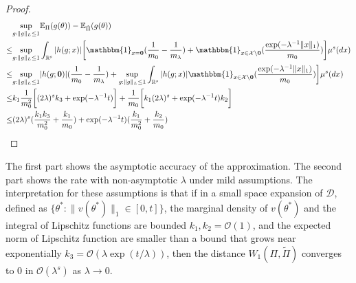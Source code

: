 \documentclass[10pt,fleqn]{article}
\newcommand{\bb}[1]{\mathbb{#1}}
\newcommand{\mc}[1]{\mathcal{#1}}
\DeclareMathOperator{\1}{\mathbbm{1}}
\begin{document}
\begin{proof}[Proof]
\begin{equation}
\begin{aligned}
& \underset{g:\|g\|_L\le 1}\sup \bb E_{\Pi}(g(\theta)) -
\bb E_{\tilde \Pi}(g(\theta)) \\
\le & \underset{g:\|g\|_L\le 1}\sup\int_{\mathbb{R}^{s}}  |h(g; x)| 
 \bigg[ \mathbbm{1}_{x=\bf 0}(\frac{1}{m_0}-\frac{1}{m_\lambda})
 + \mathbbm{1}_{x \in \mc X \setminus\bf 0}(\frac{ \exp(- \lambda^{-1} \|x\|_1) }{m_0})
\bigg]\mu^{s}(d x)\\
\le & \underset{g:\|g\|_L\le 1}\sup |h(g; {\bf 0})| 
 (\frac{1}{m_0}-\frac{1}{m_\lambda}) 
 + \underset{g:\|g\|_L\le 1}\sup \int_{\mathbb{R}^{s}} |h(g; x)|  \mathbbm{1}_{x \in \mc X \setminus\bf 0}(\frac{ \exp(- \lambda^{-1} \|x\|_1) }{m_0})
\bigg]\mu^{s}(d x)\\
\le & k_1  \frac{1}{ m_0^2} \bigg[(2\lambda)^s  k_3  + \exp(- \lambda^{-1} t ) \bigg] + \frac{1}{m_0} \bigg [ k_{1}(2\lambda)^s  + \exp(- \lambda^{-1} t ) k_2 \bigg] \\
         \le & (2\lambda)^{s} (\frac{k_1 k_3}{m_0^2} + \frac{k_1}{m_0}) + \exp(- \lambda^{-1} t )(\frac{k_1}{m_0^2} + \frac{k_2}{m_0})
        \end{aligned}
        \end{equation}


        \end{proof}

        


The first part shows the asymptotic accuracy of the approximation. The second part shows the rate with non-asymptotic $\lambda$ under mild assumptions. The interpretation for these assumptions is that if in a small space expansion of $\mc D$, defined as $\{\theta^*: \|v(\theta^*)\|_{1}\in [0,t] \}$, the marginal density of $v(\theta^*)$ and the integral of Lipschitz functions are bounded $k_1,k_2= \mc O(1)$, and the expected norm of Lipschitz function are smaller than a bound that grows near exponentially $k_3 = \mc O(\lambda \exp(t/\lambda))$, then the distance $W_1(\Pi,\tilde\Pi)$ converges to $0$ in $\mc O(\lambda^s)$ as $\lambda\to 0$.





\end{document}
